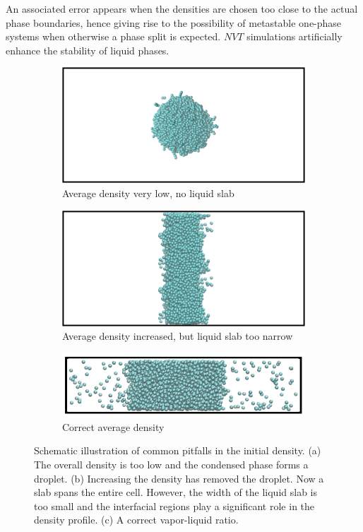 \documentclass[9pt,bestpractices]{livecoms}
\begin{document}
An associated error appears when the densities are chosen too close to the
actual phase boundaries, hence giving rise to the possibility of metastable
one-phase systems when otherwise a phase split is expected. $NVT$
simulations artificially enhance the stability of liquid phases.

\begin{figure}
	\centering
	\begin{subfigure}{0.3\textwidth} %
    \includegraphics[width=1\textwidth]{gfx/Fig_23_a.png}
    \caption{Average density very low, no liquid slab}
	\end{subfigure}
	\begin{subfigure}{0.3\textwidth} %
    \includegraphics[width=1\textwidth]{gfx/Fig_23_b.png}
    \caption{Average density increased, but liquid slab too narrow}
	\end{subfigure}
	\begin{subfigure}{0.3\textwidth} %
    \includegraphics[width=1\textwidth]{gfx/Fig_23c.jpeg}
    \caption{Correct average density}
	\end{subfigure}
  \caption{Schematic illustration of common pitfalls in the initial density. (a) The overall density is too low
           and the condensed phase forms a droplet. (b) Increasing the density has removed the droplet.
           Now a slab spans the entire cell. However, the width of the liquid slab is too small and the
           interfacial regions play a significant role in the density profile. (c) A correct vapor-liquid ratio.}
\label{fig:23}
\end{figure}
\end{document}
